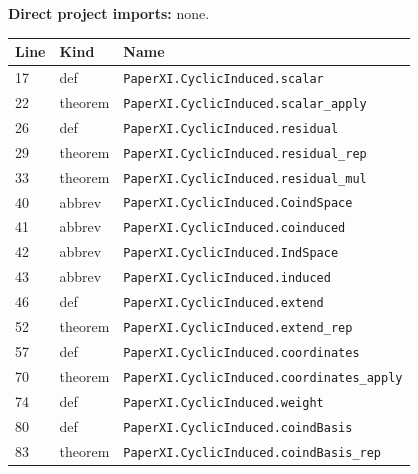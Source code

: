 \documentclass[10pt,oneside]{book}
\begin{document}

\textbf{Direct project imports:} none.

\begin{longtable}{@{}p{}p{}p{}@{}}\toprule Line&Kind&Name\\\midrule\endhead

17&def&\nolinkurl{PaperXI.CyclicInduced.scalar}\\

22&theorem&\nolinkurl{PaperXI.CyclicInduced.scalar_apply}\\

26&def&\nolinkurl{PaperXI.CyclicInduced.residual}\\

29&theorem&\nolinkurl{PaperXI.CyclicInduced.residual_rep}\\

33&theorem&\nolinkurl{PaperXI.CyclicInduced.residual_mul}\\

40&abbrev&\nolinkurl{PaperXI.CyclicInduced.CoindSpace}\\

41&abbrev&\nolinkurl{PaperXI.CyclicInduced.coinduced}\\

42&abbrev&\nolinkurl{PaperXI.CyclicInduced.IndSpace}\\

43&abbrev&\nolinkurl{PaperXI.CyclicInduced.induced}\\

46&def&\nolinkurl{PaperXI.CyclicInduced.extend}\\

52&theorem&\nolinkurl{PaperXI.CyclicInduced.extend_rep}\\

57&def&\nolinkurl{PaperXI.CyclicInduced.coordinates}\\

70&theorem&\nolinkurl{PaperXI.CyclicInduced.coordinates_apply}\\

74&def&\nolinkurl{PaperXI.CyclicInduced.weight}\\

80&def&\nolinkurl{PaperXI.CyclicInduced.coindBasis}\\

83&theorem&\nolinkurl{PaperXI.CyclicInduced.coindBasis_rep}\\


\end{longtable}
\end{document}
